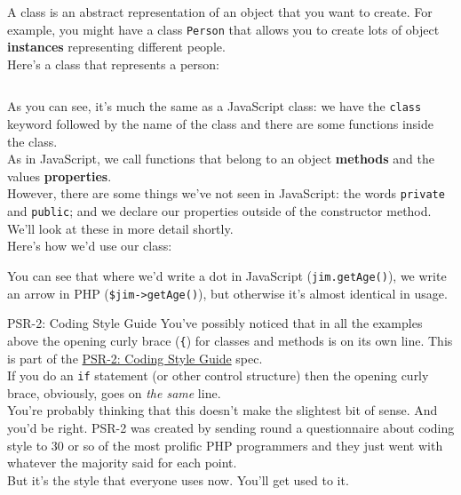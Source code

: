 A class is an abstract representation of an object that you want to create. For example, you might have a class \texttt{Person} that allows you to create lots of object \textbf{instances} representing different people.
\\

Here's a class that represents a person:

\inputminted{php}{02/figures/02/01-class.php}

As you can see, it's much the same as a JavaScript class: we have the \texttt{class} keyword followed by the name of the class and there are some functions inside the class.
\\

As in JavaScript, we call functions that belong to an object \textbf{methods} and the values \textbf{properties}.
\\

However, there are some things we've not seen in JavaScript: the words \texttt{private} and \texttt{public}; and we declare our properties outside of the constructor method. We'll look at these in more detail shortly.
\\

Here's how we'd use our class:


You can see that where we'd write a dot in JavaScript (\texttt{jim.getAge()}), we write an arrow in PHP (\texttt{\$jim->getAge()}), but otherwise it's almost identical in usage.

\begin{infobox}{PSR-2: Coding Style Guide}
    You've possibly noticed that in all the examples above the opening curly brace (\texttt{\{}) for classes and methods is on its own line. This is part of the \href{https://www.php-fig.org/psr/psr-2/}{PSR-2: Coding Style Guide} spec.
    \\

    If you do an \texttt{if} statement (or other control structure) then the opening curly brace, obviously, goes on \textit{the same} line.
    \\

    You're probably thinking that this doesn't make the slightest bit of sense. And you'd be right. PSR-2 was created by sending round a questionnaire about coding style to 30 or so of the most prolific PHP programmers and they just went with whatever the majority said for each point.
    \\

    But it's the style that everyone uses now. You'll get used to it.
\end{infobox}


